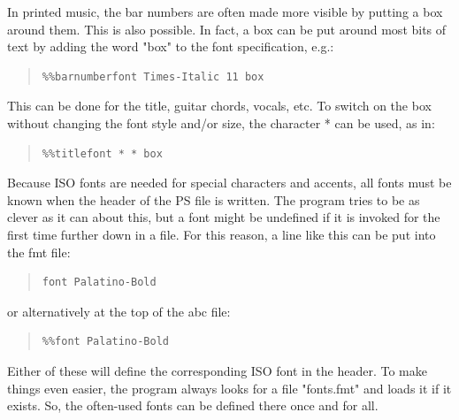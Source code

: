 \documentclass[a4paper]{article}
\begin{document}
In printed music, the bar numbers are often made more visible
by putting a box around them. This is also possible.
In fact, a box can be put around most bits of text by
adding the word "box" to the font specification, e.g.:
\begin{quote}
\begin{verbatim}
%%barnumberfont Times-Italic 11 box
\end{verbatim}
\end{quote}
This can be done for the title, guitar chords, vocals, etc.
To switch on the box without changing the font style and/or size,
the character * can be used, as in:
\begin{quote}
\begin{verbatim}
%%titlefont * * box
\end{verbatim}
\end{quote}
\par
Because ISO fonts are needed for special characters and
accents, all fonts must be known when the header of the PS file
is written. The program tries to be as clever as it can
about this, but a font might be undefined if it is invoked
for the first time further down in a file. For this reason, 
a line like this can be put into the fmt file:
\begin{quote}
\begin{verbatim}
font Palatino-Bold
\end{verbatim}
\end{quote}
or alternatively at the top of the abc file:
\begin{quote}
\begin{verbatim}
%%font Palatino-Bold
\end{verbatim}
\end{quote}
Either of these will define the corresponding ISO font in the header.
To make things even easier, the program always looks for a file
"fonts.fmt" and loads it if it exists. So, the often-used fonts
can be defined there once and for all.
\end{document}
